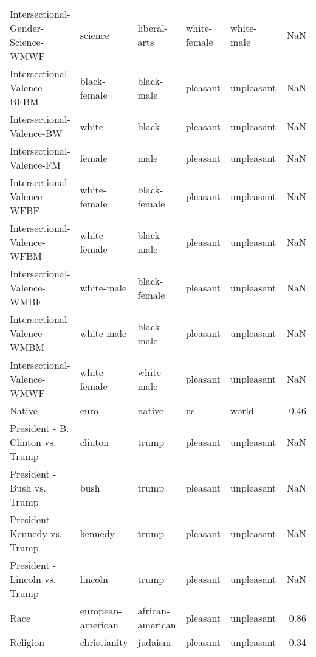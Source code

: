 \begin{tabular}{lllllr}
Intersectional-Gender-Science-WMWF &            science &      liberal-arts &  white-female &     white-male &      NaN \\
Intersectional-Valence-BFBM        &       black-female &        black-male &      pleasant &     unpleasant &      NaN \\
Intersectional-Valence-BW          &              white &             black &      pleasant &     unpleasant &      NaN \\
Intersectional-Valence-FM          &             female &              male &      pleasant &     unpleasant &      NaN \\
Intersectional-Valence-WFBF        &       white-female &      black-female &      pleasant &     unpleasant &      NaN \\
Intersectional-Valence-WFBM        &       white-female &        black-male &      pleasant &     unpleasant &      NaN \\
Intersectional-Valence-WMBF        &         white-male &      black-female &      pleasant &     unpleasant &      NaN \\
Intersectional-Valence-WMBM        &         white-male &        black-male &      pleasant &     unpleasant &      NaN \\
Intersectional-Valence-WMWF        &       white-female &        white-male &      pleasant &     unpleasant &      NaN \\
Native                             &               euro &            native &            us &          world &     0.46 \\
President - B. Clinton vs. Trump   &            clinton &             trump &      pleasant &     unpleasant &      NaN \\
President - Bush vs. Trump         &               bush &             trump &      pleasant &     unpleasant &      NaN \\
President - Kennedy vs. Trump      &            kennedy &             trump &      pleasant &     unpleasant &      NaN \\
President - Lincoln vs. Trump      &            lincoln &             trump &      pleasant &     unpleasant &      NaN \\
Race                               &  european-american &  african-american &      pleasant &     unpleasant &     0.86 \\
Religion                           &       christianity &           judaism &      pleasant &     unpleasant &    -0.34 \\

\end{tabular}
